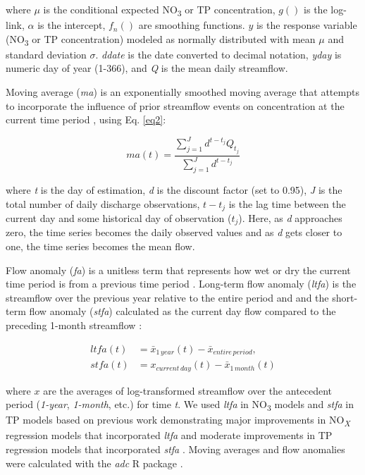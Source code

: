 \documentclass[fleqn,10pt,lineno]{wlpeerj} %
\begin{document}
where \(\mu\) is the conditional expected NO\textsubscript{3} or TP
concentration, \(g()\) is the log-link, \(\alpha\) is the intercept,
\(f_n()\) are smoothing functions. \(y\) is the response variable
(NO\textsubscript{3} or TP concentration) modeled as normally
distributed with mean \(\mu\) and standard deviation \(\sigma\).
\emph{ddate} is the date converted to decimal notation, \emph{yday} is
numeric day of year (1-366), and \emph{Q} is the mean daily streamflow.

Moving average (\emph{ma}) is an exponentially smoothed moving average
that attempts to incorporate the influence of prior streamflow events on
concentration at the current time period
\autocite{wangLoadEstimationUncertainties2011,kuhnertQuantifyingTotalSuspended2012,zhang_improving_2017},
using Eq. \ref{eq2}:

\begin{equation}
ma(t) = \frac{\sum^{J}_{j=1}{d^{t-t_j}Q_{t_{j}}}}{\sum^{J}_{j=1}d^{t-t_j}}
\label{eq2}
\end{equation}

where \emph{t} is the day of estimation, \emph{d} is the discount factor
(set to 0.95), \emph{J} is the total number of daily discharge
observations, \(t-t_j\) is the lag time between the current day and some
historical day of observation (\(t_j\)). Here, as \emph{d} approaches
zero, the time series becomes the daily observed values and as \emph{d}
gets closer to one, the time series becomes the mean flow.

Flow anomaly (\emph{fa}) is a unitless term that represents how wet or
dry the current time period is from a previous time period
\autocite{vecchiaTrendsConcentrationsUse2009,zhang_improving_2017}.
Long-term flow anomaly (\emph{ltfa}) is the streamflow over the previous
year relative to the entire period
\autocite[Eq.~\ref{eq3},][]{zhang_improving_2017} and and the short-term
flow anomaly (\emph{stfa}) calculated as the current day flow compared
to the preceding 1-month streamflow
\autocite[Eq.~\ref{eq4},][]{zhang_improving_2017}:

\begin{align}
ltfa(t) &= \bar{x}_{1\,year}(t) - \bar{x}_{entire\,period}, \label{eq3}\\
stfa(t) &= x_{current\,day}(t) - \bar{x}_{1\,month}(t) \label{eq4}
\end{align}

where \(x\) are the averages of log-transformed streamflow over the
antecedent period (\emph{1-year}, \emph{1-month}, etc.) for time
\emph{t}. We used \emph{ltfa} in NO\textsubscript{3} models and
\emph{stfa} in TP models based on previous work demonstrating major
improvements in NO\textsubscript{\emph{X}} regression models that
incorporated \emph{ltfa} and moderate improvements in TP regression
models that incorporated \emph{stfa} \autocite{zhang_improving_2017}.
Moving averages and flow anomalies were calculated with the \emph{adc} R
package \autocite{schrammAdcCalculateAntecedant2023}.
\end{document}
